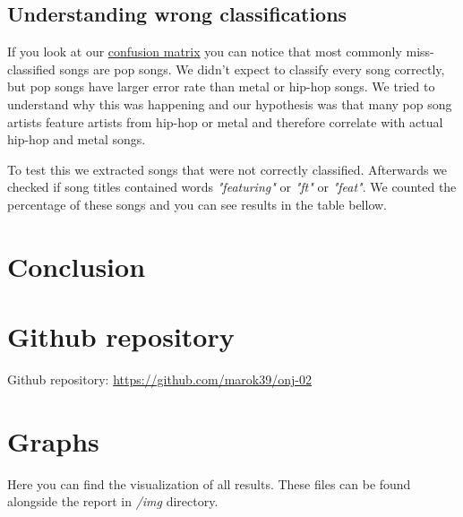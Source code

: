 \documentclass[a4paper,11pt]{article}
\begin{document}
\subsection{Understanding wrong classifications}

If you look at our \hyperref[label-cf-matrix]{confusion matrix} you can notice that most commonly miss-classified songs are pop songs. We didn't expect to classify every song correctly, but pop songs have larger error rate than metal or hip-hop songs. We tried to understand why this was happening and our hypothesis was that many pop song artists feature artists from hip-hop or metal and therefore correlate with actual hip-hop and metal songs.

To test this we extracted songs that were not correctly classified. Afterwards we checked if song titles contained words \textit{"featuring"} or \textit{"ft"} or \textit{"feat"}. We counted the percentage of these songs and you can see results in the table bellow.


\section{Conclusion}


\section{Github repository}
Github repository: \href{https://github.com/marok39/onj-02}{https://github.com/marok39/onj-02}

\pagebreak
\appendix
\appendixpage
\section{\label{label-graphs} Graphs}

Here you can find the visualization of all results. These files can be found alongside the report in \textit{/img} directory.
\end{document}
